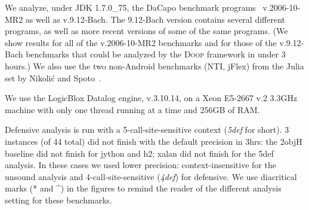 We analyze, under JDK 1.7.0\_75, the DaCapo benchmark
programs~\cite{dacapo:paper} v.2006-10-MR2 as well as v.9.12-Bach.
The
9.12-Bach version contains several different programs, as well as
more recent versions of some of the same programs.
(We show results for 
all of the v.2006-10-MR2 benchmarks and for those of the v.9.12-Bach 
benchmarks
that could be analyzed by the \textsc{Doop} framework in under 3
hours.)  We also use the two non-Android benchmarks (NTI, jFlex) from the Julia set by
Nikoli\'{c} and Spoto~\cite{DBLP:conf/ictac/NikolicS12}.

We use the LogicBlox Datalog engine, v.3.10.14, on a Xeon E5-2667 v.2
3.3GHz machine with only one thread running at a time and 256GB of RAM.

Defensive analysis is run with a 5-call-site-sensitive context
(\emph{5def} for short).  3 instances (of 44 total) did not finish
with the default precision in 3hrs: the 2objH baseline did not finish
for jython and h2; xalan did not finish for the 5def analysis. In these
cases we used lower precision: context-insensitive for the unsound analysis
and 4-call-site-sensitive (\emph{4def}) for defensive. We use diacritical
marks (* and \^{}) in the figures to remind the reader of the different
analysis setting for these benchmarks.



